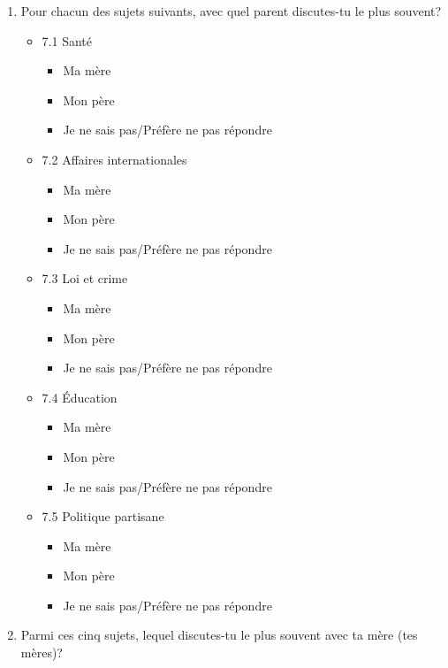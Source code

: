 \documentclass[
  letterpaper,
  DIV=11,
  numbers=noendperiod]{scrreprt}
\providecommand{\tightlist}{%
  \setlength{\itemsep}{0pt}\setlength{\parskip}{0pt}}\usepackage{longtable,booktabs,array}
\begin{document}
\begin{enumerate}
\def\labelenumi{\arabic{enumi}.}
\setcounter{enumi}{6}
\item
  Pour chacun des sujets suivants, avec quel parent discutes-tu le plus
  souvent?

  \begin{itemize}
  \tightlist
  \item
    7.1 Santé

    \begin{itemize}
    \tightlist
    \item
      Ma mère
    \item
      Mon père
    \item
      Je ne sais pas/Préfère ne pas répondre
    \end{itemize}
  \item
    7.2 Affaires internationales

    \begin{itemize}
    \tightlist
    \item
      Ma mère
    \item
      Mon père
    \item
      Je ne sais pas/Préfère ne pas répondre
    \end{itemize}
  \item
    7.3 Loi et crime

    \begin{itemize}
    \tightlist
    \item
      Ma mère
    \item
      Mon père
    \item
      Je ne sais pas/Préfère ne pas répondre
    \end{itemize}
  \item
    7.4 Éducation

    \begin{itemize}
    \tightlist
    \item
      Ma mère
    \item
      Mon père
    \item
      Je ne sais pas/Préfère ne pas répondre
    \end{itemize}
  \item
    7.5 Politique partisane

    \begin{itemize}
    \tightlist
    \item
      Ma mère
    \item
      Mon père
    \item
      Je ne sais pas/Préfère ne pas répondre
    \end{itemize}
  \end{itemize}
\item
  Parmi ces cinq sujets, lequel discutes-tu le plus souvent avec ta mère
  (tes mères)?
\end{enumerate}
\end{document}
